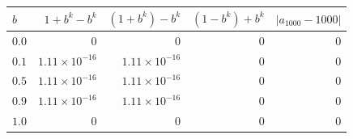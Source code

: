 \begin{tabular}{lrrrr}
\toprule
$b$ & $1+b^k-b^k$ & $(1+b^k)-b^k$ & $(1-b^k)+b^k$ & $|a_{1000} - 1000|$ \\
\midrule
$0.0$ & $0$ & $0$ & $0$ & $0$ \\
$0.1$ & $1.11 \times 10^{-16}$ & $1.11 \times 10^{-16}$ & $0$ & $0$ \\
$0.5$ & $1.11 \times 10^{-16}$ & $1.11 \times 10^{-16}$ & $0$ & $0$ \\
$0.9$ & $1.11 \times 10^{-16}$ & $1.11 \times 10^{-16}$ & $0$ & $0$ \\
$1.0$ & $0$ & $0$ & $0$ & $0$ \\
\bottomrule
\end{tabular}
